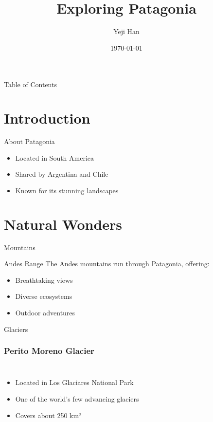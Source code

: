 \documentclass[t, aspectratio=169]{beamer}
\title{Exploring Patagonia}
\author{Yeji Han}
\institute{Seoul National University}
\date{\today}
\begin{document}
\begin{frame}
  \titlepage
\end{frame}

\begin{frame}{Table of Contents}
  \tableofcontents
\end{frame}

\section{Introduction}

\begin{frame}{About Patagonia}
  \begin{itemize}
    \item Located in South America
    \item Shared by Argentina and Chile
    \item Known for its stunning landscapes
  \end{itemize}
\end{frame}

\section{Natural Wonders}

\begin{frame}{Mountains}
  \begin{block}{Andes Range}
    The Andes mountains run through Patagonia, offering:
    \begin{itemize}
      \item Breathtaking views
      \item Diverse ecosystems
      \item Outdoor adventures
    \end{itemize}
  \end{block}
\end{frame}

\begin{frame}{Glaciers}
  \frametitle{Perito Moreno Glacier}
  \begin{columns}[c]
    \begin{itemize}
      \item Located in Los Glaciares National Park
      \item One of the world's few advancing glaciers
      \item Covers about 250 km²
    \end{itemize}
    
  \end{columns}
\end{frame}
\end{document}
